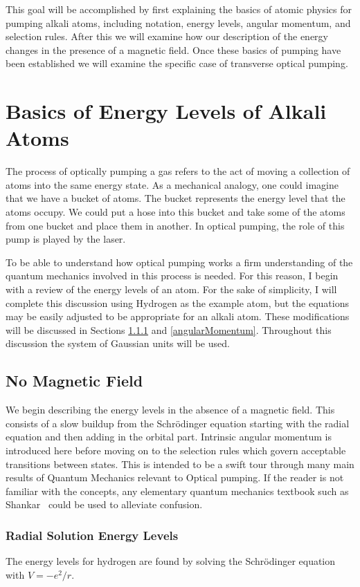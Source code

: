 \documentclass[12pt]{article}
\newcommand{\schr}{Schr\"odinger}
\begin{document}
This goal will  be accomplished by first explaining the basics 
of atomic physics for pumping alkali atoms, including notation, energy
levels, angular momentum, and selection rules. After this we
will examine how our description of the energy changes in the
presence of a magnetic
field. Once these basics of pumping have been established we will
examine the specific case of transverse optical pumping. 

\section{Basics of Energy Levels of Alkali Atoms}
The process of optically pumping a gas refers to the 
act of moving a collection of atoms into the 
same energy state. As a mechanical analogy, one could
imagine that we have a bucket of atoms. The bucket 
represents the energy level that the atoms
occupy. We could put a hose into this
bucket and take some of the atoms from one bucket and
place them in another. In optical pumping, the role of 
this pump is played by the laser. 

To be able to understand how optical pumping works a firm 
understanding of the quantum mechanics involved in this 
process is needed. For this reason, I begin with a review of the energy
levels of an atom. For the sake of simplicity, I will complete
this discussion using
Hydrogen as the example atom, but the equations may be 
easily adjusted to be appropriate for an alkali atom.
These modifications will be discussed in Sections \ref{energyLevels}
and \ref{angularMomentum}. Throughout this discussion
the system of Gaussian units will be used. 
	\subsection{No Magnetic Field}
    We begin describing the energy levels in the absence of 
    a magnetic field. This consists of a slow buildup 
    from the Schr\"odinger equation starting with the radial
    equation and then adding in the orbital part. Intrinsic 
    angular momentum is introduced here before moving on to
    the selection rules which govern acceptable transitions
    between states. This is intended to be a swift tour through
	many main results of Quantum Mechanics relevant to 
	Optical pumping. If the reader is not familiar with the 
	concepts, any elementary quantum mechanics textbook
	such as Shankar~\cite{shankar} could be used to alleviate confusion.
		\subsubsection{Radial Solution Energy Levels}\label{energyLevels}
		The energy levels for hydrogen are found by solving the
		{\schr} equation with $V=-e^2/r$. 
\end{document}
